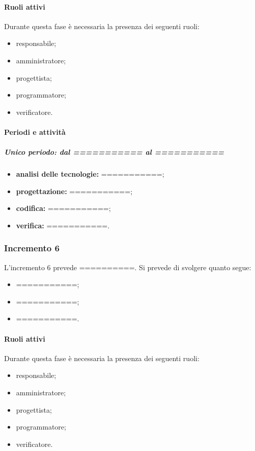 \paragraph{Ruoli attivi}
Durante questa fase è necessaria la presenza dei seguenti ruoli: 
\begin{itemize} 
	\item responsabile; 
	\item amministratore; 
	\item progettista; 
	\item programmatore; 
	\item verificatore.
\end{itemize}

\paragraph{Periodi e attività}
\subparagraph{Unico periodo: dal =========== al ===========}
\begin{itemize}
	\item \textbf{analisi delle tecnologie:} ===========;
	\item \textbf{progettazione:} ===========;
	\item \textbf{codifica:} ===========;
	\item \textbf{verifica:} ===========.
\end{itemize}


\subsubsection{Incremento 6}
L'incremento 6 prevede ==========. Si prevede di svolgere quanto segue:
\begin{itemize}
	\item ===========;
	\item ===========;
	\item ===========.
\end{itemize}

\paragraph{Ruoli attivi}
Durante questa fase è necessaria la presenza dei seguenti ruoli: 
\begin{itemize} 
	\item responsabile; 
	\item amministratore; 
	\item progettista; 
	\item programmatore; 
	\item verificatore.
\end{itemize}

